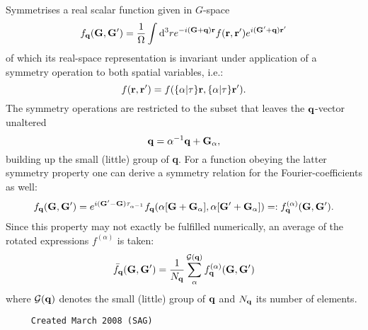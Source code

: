 \documentclass[11pt]{article}
\begin{document}
     Symmetrises a real scalar function given in $G$-space
     $$ f_{\bf q}({\bf G},{\bf G'}) = \frac{1}{\Omega}\int {\rm d}^3r 
     e^{-i{\bf (G+q)r}} f({\bf r},{\bf r'}) e^{i{\bf (G'}+{\bf q}){\bf r'}} $$
     of which its real-space representation is invariant under application of
     a symmetry  operation to both spatial variables, i.e.:
     $$ f({\bf r},{\bf r'}) = f(\{\alpha|\tau\}{\bf r},\{\alpha|\tau\}{\bf r'}).
     $$
     The symmetry operations are restricted to the subset that leaves the
     ${\bf q}$-vector unaltered
     $$ {\bf q}=\alpha^{-1}{\bf q} + {\bf G}_{\alpha},  $$
     building up the small (little) group of {\bf q}.
     For a function obeying the latter symmetry property one can derive a
     symmetry relation for the Fourier-coefficients as well:
     $$ f_{\bf q}({\bf G},{\bf G'}) =  
     e^{i({\bf G'}-{\bf G})\tau_{\alpha^{-1}}} 
     f_{\bf q}(\alpha[{\bf G}+{\bf G}_{\alpha}],
     \alpha[{\bf G'}+{\bf G}_{\alpha}]) =: f^{(\alpha)}_{\bf q}({\bf G},
     {\bf G'}).$$
     Since this property may not exactly be fulfilled numerically, an average
     of the rotated expressions $f^{(\alpha)}$ is taken:
     $$  \bar{f}_{\bf q}({\bf G},{\bf G'})= \frac{1}{N_{\bf q}}
     \sum_{\alpha}^{\mathcal{G}({\bf q})}
     f^{(\alpha)}_{\bf q}({\bf G},{\bf G'}) $$
     where $\mathcal{G}({\bf q})$ denotes the small (little) group of ${\bf q}$
     and $N_{\bf q}$ its number of elements.
  
\begin{verbatim}     Created March 2008 (SAG)\end{verbatim}















\end{document}
